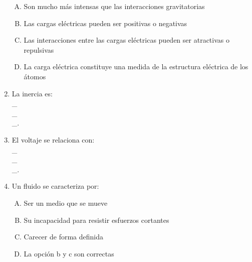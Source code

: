 \begin{enumerate}
\begin{enumerate}[(A)]
\item  Son mucho más intensas que las interacciones gravitatorias
\item  Las cargas eléctricas pueden ser positivas o negativas
\item  Las interacciones entre las cargas eléctricas pueden ser atractivas o repulsivas
\item  La carga eléctrica constituye una medida de la estructura eléctrica de los átomos
\end{enumerate}

\item  La inercia es: \label{yolf-23}\hrulefill\\
\_\hrulefill\\
\_\hrulefill\\
\_\hrulefill.





\item   El voltaje se relaciona con: \label{yolf-25}\hrulefill\\
\_\hrulefill\\
\_\hrulefill\\
\_\hrulefill.


\newpage
\item   Un fluido se caracteriza por: \label{yolf-24}\\

\begin{enumerate}[(A)]
\item  Ser un medio que se mueve
\item  Su incapacidad para resistir esfuerzos cortantes
\item  Carecer de forma definida
\item  La opción b y c son correctas
\end{enumerate}

\end{enumerate}

